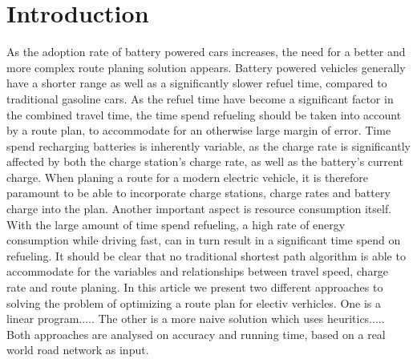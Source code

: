 \section{Introduction}
	As the adoption rate of battery powered cars increases, the need for a better and more complex route planing solution appears. Battery powered vehicles generally have a shorter range as well as a significantly slower refuel time, compared to traditional gasoline cars. As the refuel time have become a significant factor in the combined travel time, the time spend refueling should be taken into account by a route plan, to accommodate for an otherwise large margin of error.
	Time spend recharging batteries is inherently variable, as the charge rate is significantly affected by both the charge station’s charge rate, as well as the battery’s current charge. When planing a route for a modern electric vehicle, it is therefore paramount to be able to incorporate charge stations, charge rates and battery charge into the plan.
	Another important aspect is resource consumption itself. With the large amount of time spend refueling, a high rate of energy consumption while driving fast, can in turn result in a significant time spend on refueling.
	It should be clear that no traditional shortest path algorithm is able to accommodate for the variables and relationships between travel speed, charge rate and route planing. In this article we present two different approaches to solving the problem of optimizing a route plan for electiv verhicles. One is a linear program..... The other is a more naive solution which uses heuritics..... Both approaches are analysed on accuracy and running time, based on a real world road network as input.

